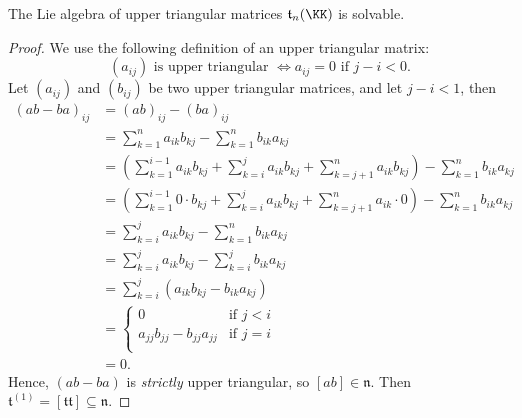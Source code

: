 \documentclass{article}
\newcommand{\lb}[1]{\ensuremath{\left[{#1}\right]}}
\newcommand{\talg}{\ensuremath{\mathfrak{t}}}
\newcommand{\nalg}{\ensuremath{\mathfrak{n}}}
\begin{document}
\begin{proposition}
    The Lie algebra of upper triangular matrices $\talg_n(\KK)$ is solvable.
\end{proposition}
\begin{proof}
    We use the following definition of an upper triangular matrix:
    \[
        (a_{ij}) \text{ is upper triangular }
        \iff
        a_{ij} = 0 \text{ if } j - i < 0.
    \]
    Let $(a_{ij})$ and $(b_{ij})$ be two upper triangular matrices, and let $j - i < 1$, then
    \begin{align*}
        (ab - ba)_{ij}
        &=
        (ab)_{ij}
        -
        (ba)_{ij}
        \\
        &=
        \sum_{k=1}^n
        a_{ik}b_{kj}
        -
        \sum_{k=1}^n
        b_{ik}a_{kj}
        \\
        &=
        \left(
            \sum_{k=1}^{i-1}
            a_{ik}b_{kj}
            +
            \sum_{k=i}^j
            a_{ik}b_{kj}
            +
            \sum_{k=j+1}^n
            a_{ik}b_{kj}
        \right)
        -
        \sum_{k=1}^n
        b_{ik}a_{kj}
        \\
        &=
        \left(
            \sum_{k=1}^{i-1}
            0 \cdot b_{kj}
            +
            \sum_{k=i}^j
            a_{ik}b_{kj}
            +
            \sum_{k=j+1}^n
            a_{ik} \cdot 0
        \right)
        -
        \sum_{k=1}^n
        b_{ik}a_{kj}
        \\
        &=
        \sum_{k=i}^j
        a_{ik}b_{kj}
        -
        \sum_{k=1}^n
        b_{ik}a_{kj}
        \\
        &=
        \sum_{k=i}^j
        a_{ik}b_{kj}
        -
        \sum_{k=i}^j
        b_{ik}a_{kj}
        \\
        &=
        \sum_{k=i}^j
        (a_{ik}b_{kj} - b_{ik}a_{kj})
        \\
        &=
        \begin{cases}
            0 & \text{if }j < i \\
            a_{jj}b_{jj} - b_{jj}a_{jj} & \text{if }j = i \\
        \end{cases}
        \\
        &=
        0.
    \end{align*}
    Hence, $(ab - ba)$ is \textit{strictly} upper triangular, so $\lb{ab} \in \nalg$.
    Then $\talg^{(1)} = \lb{\talg\talg} \subseteq \nalg$.


\end{proof}
\end{document}
